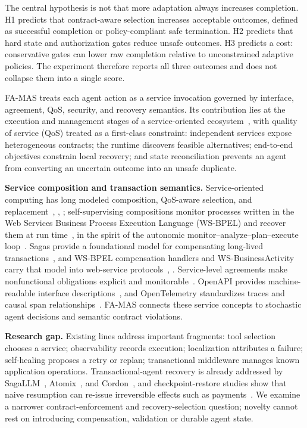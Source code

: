 \documentclass[10pt,journal,compsoc]{IEEEtran}
\newcommand{\famas}{FA-MAS}
\begin{document}
The central hypothesis is not that more adaptation always increases completion. H1 predicts that contract-aware selection increases acceptable outcomes, defined as successful completion or policy-compliant safe termination. H2 predicts that hard state and authorization gates reduce unsafe outcomes. H3 predicts a cost: conservative gates can lower raw completion relative to unconstrained adaptive policies. The experiment therefore reports all three outcomes and does not collapse them into a single score.

\famas{} treats each agent action as a service invocation governed by interface, agreement, QoS, security, and recovery semantics. Its contribution lies at the execution and management stages of a service-oriented ecosystem~\cite{papazoglou2007soc}, with quality of service (QoS) treated as a first-class constraint: independent services expose heterogeneous contracts; the runtime discovers feasible alternatives; end-to-end objectives constrain local recovery; and state reconciliation prevents an agent from converting an uncertain outcome into an unsafe duplicate.

\textbf{Service composition and transaction semantics.} Service-oriented computing has long modeled composition, QoS-aware selection, and replacement~\cite{papazoglou2007soc}, \cite{zeng2004qos}, \cite{sheng2014composition}; self-supervising compositions monitor processes written in the Web Services Business Process Execution Language (WS-BPEL) and recover them at run time~\cite{baresi2011selfsupervising}, in the spirit of the autonomic monitor--analyze--plan--execute loop~\cite{kephart2003autonomic}. Sagas provide a foundational model for compensating long-lived transactions~\cite{garcia1987sagas}, and WS-BPEL compensation handlers and WS-BusinessActivity carry that model into web-service protocols~\cite{wsbpel2007}, \cite{wsba2009}. Service-level agreements make nonfunctional obligations explicit and monitorable~\cite{keller2003wsla}. OpenAPI provides machine-readable interface descriptions~\cite{openapi311}, and OpenTelemetry standardizes traces and causal span relationships~\cite{otel2026}. \famas{} connects these service concepts to stochastic agent decisions and semantic contract violations.

\textbf{Research gap.} Existing lines address important fragments: tool selection chooses a service; observability records execution; localization attributes a failure; self-healing proposes a retry or replan; transactional middleware manages known application operations. Transactional-agent recovery is already addressed by SagaLLM~\cite{chang2025sagallm}, Atomix~\cite{mohammadi2026atomix}, and Cordon~\cite{chen2026cordon}, and checkpoint-restore studies show that naive resumption can re-issue irreversible effects such as payments~\cite{zheng2026acrfence}. We examine a narrower contract-enforcement and recovery-selection question; novelty cannot rest on introducing compensation, validation or durable agent state.
\end{document}
